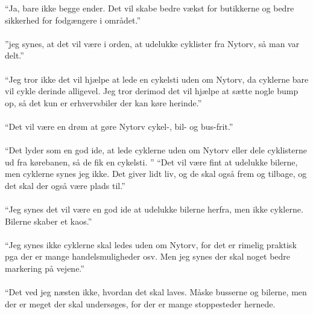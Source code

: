   “Ja, bare ikke begge ender. Det vil skabe bedre vækst for butikkerne og bedre sikkerhed for fodgængere i området.”
\\\\
  ”jeg synes, at det vil være i orden, at udelukke cyklister fra Nytorv, så man var delt.”
\\\\
  “Jeg tror ikke det vil hjælpe at lede en cykelsti uden om Nytorv, da cyklerne bare vil cykle derinde alligevel. Jeg tror derimod det vil hjælpe at sætte nogle bump op, så det kun er erhvervsbiler der kan køre herinde.”
\\\\
  “Det vil være en drøm at gøre Nytorv cykel-, bil- og bus-frit.”
\\\\
  “Det lyder som en god ide, at lede cyklerne uden om Nytorv eller dele cyklisterne ud fra kørebanen, så de fik en cykelsti. ”
  “Det vil være fint at udelukke bilerne, men cyklerne synes jeg ikke. Det giver lidt liv, og de skal også frem og tilbage, og det skal der også være plads til.”
\\\\

  “Jeg synes det vil være en god ide at udelukke bilerne herfra, men ikke cyklerne. Bilerne skaber et kaos.”
\\\\
  “Jeg synes ikke cyklerne skal ledes uden om Nytorv, for det er rimelig praktisk pga der er mange handelsmuligheder osv. Men jeg synes der skal noget bedre markering på vejene.”
\\\\
  “Det ved jeg næsten ikke, hvordan det skal laves. Måske busserne og bilerne, men der er meget der skal undersøges, for der er mange stoppesteder hernede.
